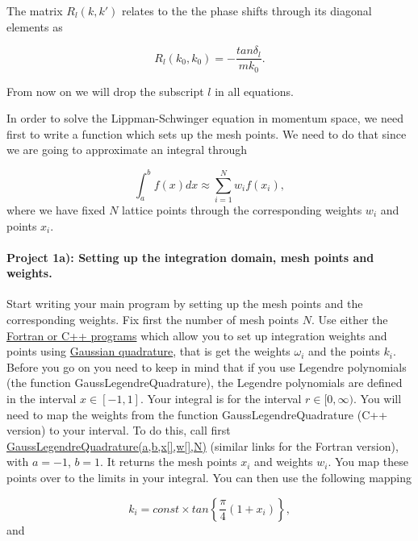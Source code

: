 \documentclass[%
oneside,                 %
final,                   %
10pt]{article}
\begin{document}
The matrix $R_l(k,k')$ relates to the 
the  phase shifts through its diagonal elements as

\begin{equation}
     R_l(k_0,k_0)=-\frac{tan\delta_l}{mk_0}.
     \label{eq:shifts}
\end{equation}

From now on we will drop the subscript $l$ in all equations.

In order to solve the Lippman-Schwinger equation 
in momentum space, we need first to write 
a function which sets up the mesh points. 
We need to do that since we are going to approximate an integral
through

\begin{equation*}
   \int_a^bf(x)dx\approx\sum_{i=1}^Nw_if(x_i),
\end{equation*}
where we have fixed $N$ lattice points through the corresponding weights
$w_i$ and points $x_i$. 

\paragraph{Project 1a): Setting up the integration domain, mesh points and weights.}
Start writing your main program by setting up the mesh points
and the corresponding weights.
Fix first the number of mesh points $N$.
Use either the \href{{https://github.com/ManyBodyPhysics/NuclearForces/tree/master/doc/Programs/ScatteringTheory}}{Fortran or C++ programs}  which allow you to set up integration weights and points using \href{{http://compphysics.github.io/ComputationalPhysics/doc/pub/integrate/html/integrate-reveal.html}}{Gaussian quadrature}, that is get the
weights $\omega_i$ and the points $k_i$. Before you go on 
you need to keep in mind that if you use Legendre polynomials (the function GaussLegendreQuadrature),
the Legendre polynomials are defined in the  
interval $x\in [-1,1]$. Your integral is for the interval $r\in [0,\infty)$. 
You will need to map the weights  from the function GaussLegendreQuadrature (C++ version) to your interval.
To do this, call first \href{{https://github.com/ManyBodyPhysics/NuclearForces/blob/master/doc/Programs/ScatteringTheory/Cpp/IntegrationExample/integrationexample.cpp}}{GaussLegendreQuadrature(a,b,x[],w[],N)} (similar links for the Fortran version), 
with $a=-1$, $b=1$.
It returns the mesh points $x_i$ and weights $w_i$. 
You map these points over to the limits in your integral. You can then
use the following mapping

\begin{equation*}
          k_i=const\times tan\left\{\frac{\pi}{4}(1+x_i)\right\},
        \end{equation*}
and
\end{document}
